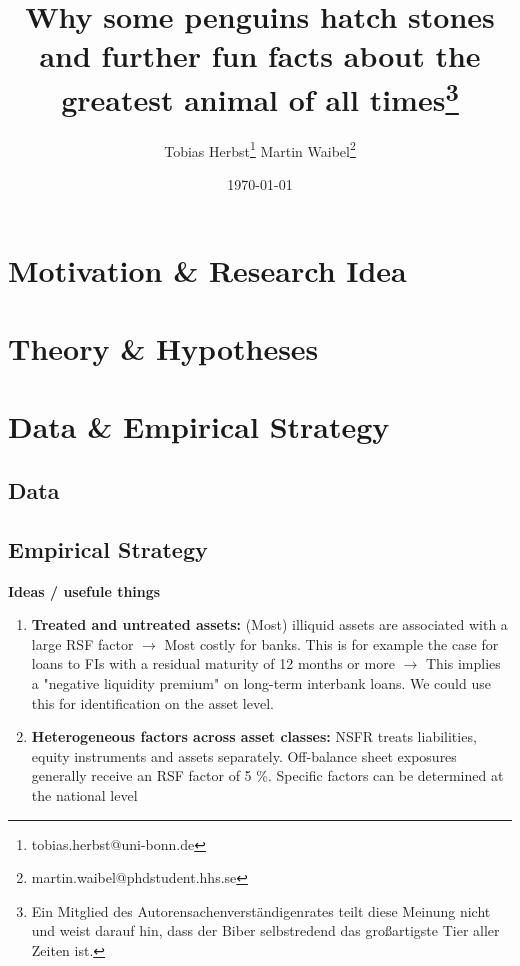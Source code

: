 \documentclass[a4paper,12pt]{article}
\title{Why some penguins hatch stones and further fun facts about the greatest animal of all times\footnote{Ein Mitglied des Autorensachenverständigenrates teilt diese Meinung nicht und weist darauf hin, dass der Biber selbstredend das großartigste Tier aller Zeiten ist.}}
\author{Tobias Herbst\thanks{tobias.herbst@uni-bonn.de} \hspace{1cm}  Martin Waibel\thanks{martin.waibel@phdstudent.hhs.se} }
\date{\today}
\begin{document}
\maketitle

\begin{abstract}
\lipsum[1-1]




\end{abstract}

\clearpage
\section{Motivation \& Research Idea}
\label{motivation}


\section{Theory \& Hypotheses}
\label{hypotheses}


\section{Data \& Empirical Strategy}
\label{data_strategy}

\subsection{Data}
\label{data}



\subsection{Empirical Strategy}
\label{emp_strategy}

\textbf{Ideas / usefule things}
\begin{enumerate}
	\item \textbf{Treated and untreated assets:} (Most) illiquid assets are associated with a large RSF factor $\rightarrow$ Most costly for banks. This is for example the case for loans to FIs with a residual maturity of 12 months or more $\rightarrow$ This implies a "negative liquidity premium" on long-term interbank loans. We could use this for identification on the asset level.

	\item \textbf{Heterogeneous factors across asset classes:} NSFR treats liabilities, equity instruments and assets separately. Off-balance sheet exposures generally receive an RSF factor of 5 \%. Specific factors can be determined at the national level 

\end{enumerate}
\end{document}
